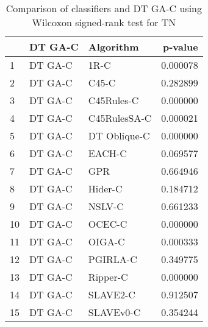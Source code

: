 \begin{table}
\footnotesize
\caption{Comparison of classifiers and DT GA-C using Wilcoxon signed-rank test for TN}
\label{tab:DT GA-C wilcoxon TN comparison}
\begin{tabular}{lllr}
\hline
 & DT GA-C & Algorithm & p-value \\
\hline
1 & DT GA-C & 1R-C & 0.000078 \\
2 & DT GA-C & C45-C & 0.282899 \\
3 & DT GA-C & C45Rules-C & 0.000000 \\
4 & DT GA-C & C45RulesSA-C & 0.000021 \\
5 & DT GA-C & DT Oblique-C & 0.000000 \\
6 & DT GA-C & EACH-C & 0.069577 \\
7 & DT GA-C & GPR & 0.664946 \\
8 & DT GA-C & Hider-C & 0.184712 \\
9 & DT GA-C & NSLV-C & 0.661233 \\
10 & DT GA-C & OCEC-C & 0.000000 \\
11 & DT GA-C & OIGA-C & 0.000333 \\
12 & DT GA-C & PGIRLA-C & 0.349775 \\
13 & DT GA-C & Ripper-C & 0.000000 \\
14 & DT GA-C & SLAVE2-C & 0.912507 \\
15 & DT GA-C & SLAVEv0-C & 0.354244 \\
\hline
\end{tabular}
\end{table}
